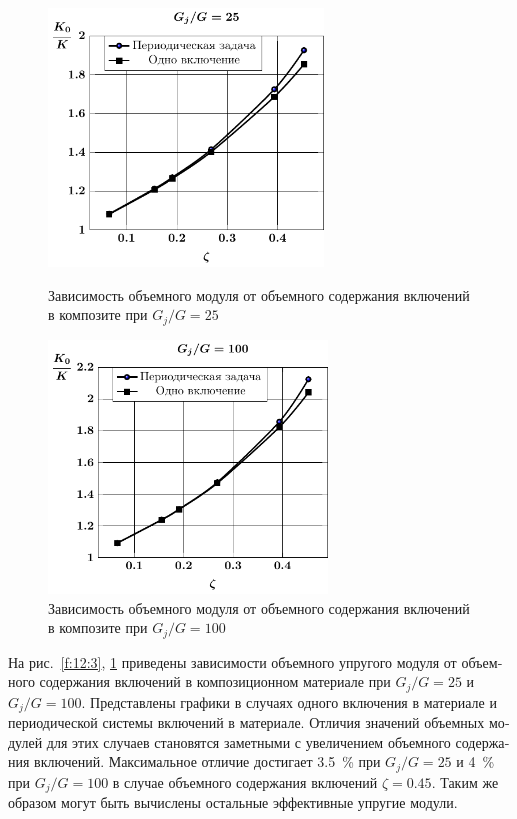 \begin{russian}
\begin{figure}[h!]
\centering\footnotesize
\parbox[b]{7.5cm}{\centering\includegraphics[width=7.3cm]{composite-spheres-g25-k.pdf}
\caption{Зависимость объемного модуля от объемного содержания включений в композите при $G_j/G=25$
\label{f:12:3}}}\hfil\hfil
\parbox[b]{7.5cm}{\centering\includegraphics[width=7.4cm]{composite-spheres-g100-k.pdf}
\caption{Зависимость объемного модуля от объемного содержания включений в композите при $G_j/G=100$
\label{f:12:4}}}
\end{figure}

На рис.~\ref{f:12:3}, \ref{f:12:4} приведены зависимости объемного упругого модуля от объемного содержания включений в композиционном материале при $G_j/G=25$ и $G_j/G=100$. Представлены графики в случаях одного включения в материале и периодической системы включений в материале. Отличия значений объемных модулей для этих случаев становятся заметными с увеличением объемного содержания включений. Максимальное отличие достигает 3.5~\% при $G_j/G=25$ и 4~\% при $G_j/G=100$ в случае объемного содержания включений $\zeta=0.45$. Таким же образом могут быть вычислены остальные эффективные упругие модули.

\end{russian}